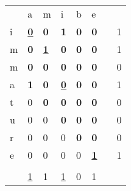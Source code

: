 \documentclass{KodeBook}
\begin{document}
\begin{figure}[!ht]
	
\begin{minipage}{0.45\textwidth}

\begin{tabular}{|l|l|l|l|l|l|l|l|}
	\cline{1-6}
	  & a & m & i & b & e & \multicolumn{2}{l}{ }\\
	\cline{1-6}\cline{8-8}
	i & \underline{\textbf{0}} & \textbf{0} & \textbf{1} & \textbf{0} & \textbf{0} & & 1\\
	\cline{1-6}\cline{8-8}
	m & \textbf{0} & \underline{\textbf{1}} & \textbf{0} & \textbf{0} & \textbf{0} & & 1\\
	\cline{1-6}\cline{8-8}
	m & \textbf{0} & \textbf{0} & \textbf{0} & \textbf{0} & \textbf{0} & & 0\\
	\cline{1-6}\cline{8-8}
	a & \textbf{1} & \textbf{0} & \underline{\textbf{0}} & \textbf{0} & \textbf{0} & & 1\\
	\cline{1-6}\cline{8-8}
	t & 0 & \textbf{0} & \textbf{0} & \textbf{0} & \textbf{0} & & 0\\
	\cline{1-6}\cline{8-8}
	u & 0 & 0 & \textbf{0} & \textbf{0} & \textbf{0} & & 0\\
	\cline{1-6}\cline{8-8}
	r & 0 & 0 & 0 & \textbf{0} & \textbf{0} & & 0\\
	\cline{1-6}\cline{8-8}
	e & 0 & 0 & 0 & 0 & \underline{\textbf{1}} & & 1\\
	\cline{1-6}\cline{8-8}
	\multicolumn{8}{l}{ }\\
	\cline{2-6}
	 \multicolumn{1}{l|}{} & \underline{1} & 1 & \underline{1} & 0 & 1 & \multicolumn{2}{l}{ }\\
	\cline{2-6}
\end{tabular}

\end{minipage}
\begin{minipage}{0.45\textwidth}


\end{minipage}
\end{figure}
\end{document}
